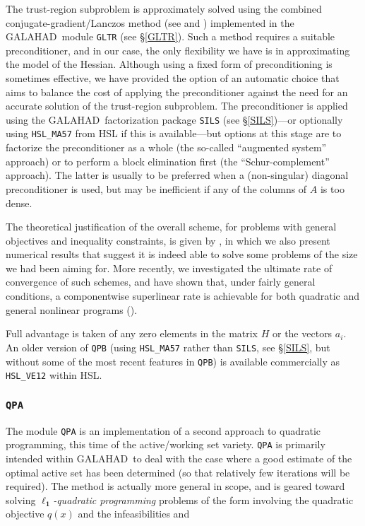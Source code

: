 \documentclass[twoside]{article}
\newcommand{\gal}{{\sf GALAHAD}}
\newcommand{\ltsubsubsection}[1]{\subsubsection{{\tt #1}} \label{#1}}
\begin{document}
The trust-region subproblem is approximately solved using the
combined conjugate-gradient/Lan\-czos method (see  and
) implemented in the \gal\ module {\tt GLTR}
(see \S\ref{GLTR}).
Such a method requires a suitable preconditioner,
and in our case, the only flexibility we have is in approximating the
model of the Hessian. Although using a fixed form of preconditioning is
sometimes effective, we have provided the option of an automatic choice
that aims to balance the cost of applying the preconditioner against
the need for an accurate solution of the trust-region subproblem.
The preconditioner is applied using the \gal\ factorization package
{\tt SILS} (see \S\ref{SILS})---or optionally using {\tt HSL\_MA57}
from HSL if this is available---but options at this stage are
to factorize the preconditioner as a whole (the so-called ``augmented system''
approach) or to perform a block elimination first (the ``Schur-complement''
approach). The latter is usually to be preferred when a (non-singular) diagonal
preconditioner is used, but may be inefficient if any of the columns
of $A$ is too dense.

The theoretical justification of the
overall scheme, for problems with general objectives and
inequality constraints,
is given by , in which we also present
numerical results that suggest it is indeed able to solve
some problems of the size we had been aiming for.
More recently, we investigated the ultimate rate of convergence
of such schemes, and have shown that, under fairly general conditions,
a componentwise superlinear rate is achievable for both quadratic and general
nonlinear programs ().

Full advantage is taken of any zero elements in the matrix $H$ or the
vectors $a_{i}$.
An older version of {\tt QPB} (using {\tt HSL\_MA57} rather than {\tt SILS},
see \S\ref{SILS}, but without some of the most recent features in {\tt QPB})
is available commercially as {\tt HSL\_VE12} within HSL.

\ltsubsubsection{QPA}

The module {\tt QPA} is an implementation of a second approach
to quadratic programming, this time of the active/working set variety.
{\tt QPA} is primarily intended within \gal\ to deal with the case
where a good
estimate of the optimal active set has been determined (so that
relatively few iterations will be required). The method is actually more
general in scope, and is geared toward solving
{\em $\mathbf{\ell_1}$-quadratic programming} problems of the form
involving the quadratic objective $q(x)$ and the infeasibilities
and
\end{document}
